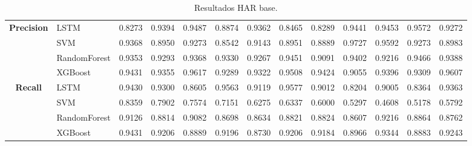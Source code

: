 \begin{table}[h]
\begin{adjustbox}{max width=15cm}
\begin{tabular}{|c|l|r|r|r|r|r|r|r|r|r|r|r|}
			\hline
			\textbf{Precision} & LSTM &  0.8273 &  0.9394 &  0.9487 &  0.8874 &  0.9362 &  0.8465 &  0.8289 &  0.9441 &  0.9453 &  0.9572 &  0.9272 \\
			& SVM &  0.9368 &  0.8950 &  0.9273 &  0.8542 &  0.9143 &  0.8951 &  0.8889 &  0.9727 &  0.9592 &  0.9273 &  0.8983 \\
			& RandomForest &  0.9353 &  0.9293 &  0.9368 &  0.9330 &  0.9267 &  0.9451 &  0.9091 &  0.9402 &  0.9216 &  0.9466 &  0.9388 \\
			& XGBoost &  0.9431 &  0.9355 &  0.9617 &  0.9289 &  0.9322 &  0.9508 &  0.9424 &  0.9055 &  0.9396 &  0.9309 &  0.9607 \\
			\hline
			\textbf{Recall} & LSTM &  0.9430 &  0.9300 &  0.8605 &  0.9563 &  0.9119 &  0.9577 &  0.9012 &  0.8204 &  0.9005 &  0.8364 &  0.9363 \\
			& SVM &  0.8359 &  0.7902 &  0.7574 &  0.7151 &  0.6275 &  0.6337 &  0.6000 &  0.5297 &  0.4608 &  0.5178 &  0.5792 \\
			& RandomForest &  0.9126 &  0.8814 &  0.9082 &  0.8698 &  0.8634 &  0.8821 &  0.8824 &  0.8607 &  0.9216 &  0.8864 &  0.8762 \\
			& XGBoost &  0.9431 &  0.9206 &  0.8889 &  0.9196 &  0.8730 &  0.9206 &  0.9184 &  0.8966 &  0.9344 &  0.8883 &  0.9243 \\
			\hline
		\end{tabular}
	\end{adjustbox}
	\caption{Resultados HAR base.}
	\label{tab:HAR_base}
\end{table}
\newpage

